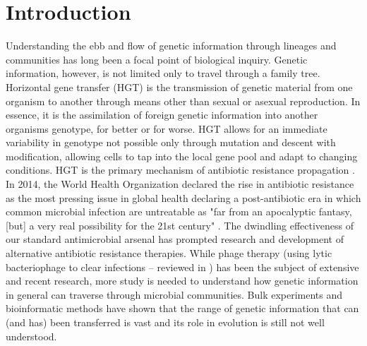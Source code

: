 \section*{Introduction}
\indent Understanding the ebb and flow of genetic information through lineages
and communities has long been a focal point of biological inquiry.  Genetic
information, however, is not limited only to travel through a family tree.
Horizontal gene transfer (HGT) is the transmission of genetic material from one
organism to another through means other than sexual or asexual reproduction. In
essence, it is the assimilation of foreign genetic information into another
organisms genotype, for better or for worse. HGT allows for an immediate
variability in genotype not possible only through mutation and descent with
modification, allowing cells to tap into the local gene pool and adapt to
changing conditions.  HGT is the primary mechanism of antibiotic resistance
propagation \cite{Gyles:2014je,Koonin:2001vz, Avrain:2004hb}. In 2014, the World
Health Organization declared the rise in antibiotic resistance as the most
pressing issue in global health declaring a post-antibiotic era in which common
microbial infection are untreatable as "far from an apocalyptic fantasy, [but] a
very real possibility for the 21st century"
\cite{WorldHealthOrganization:2014ww}.  The dwindling effectiveness of our
standard antimicrobial arsenal has prompted research and development of
alternative antibiotic resistance therapies. While phage therapy (using lytic
bacteriophage to clear infections -- reviewed in \citet{Knoll:2014gq}) has been
the subject of extensive and recent research, more study is needed to understand
how genetic information in general can traverse through microbial communities.
Bulk experiments and bioinformatic methods have shown that the range of genetic
information that can (and has) been transferred is vast and its role in
evolution is still not well understood.

